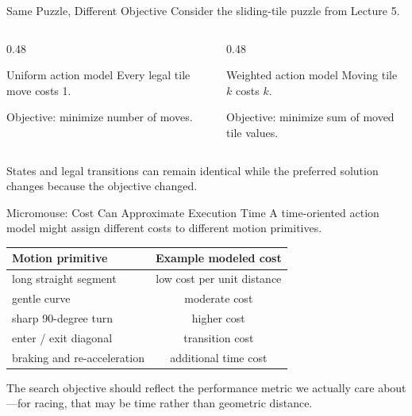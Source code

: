 \documentclass[aspectratio=169,10pt]{beamer}
\begin{document}
\begin{frame}[shrink=20]{Same Puzzle, Different Objective}
  Consider the sliding-tile puzzle from Lecture 5.

  \begin{columns}[T,onlytextwidth]
    \begin{column}{0.48\textwidth}
      \begin{block}{Uniform action model}
        Every legal tile move costs 1.

        \vspace{0.08in}
        Objective: minimize number of moves.
      \end{block}
    \end{column}

    \begin{column}{0.48\textwidth}
      \begin{block}{Weighted action model}
        Moving tile $k$ costs $k$.

        \vspace{0.08in}
        Objective: minimize sum of moved tile values.
      \end{block}
    \end{column}
  \end{columns}

  \begin{keyidea}
    States and legal transitions can remain identical while the preferred solution changes because the objective changed.
  \end{keyidea}
\end{frame}

\begin{frame}[shrink=20]{Micromouse: Cost Can Approximate Execution Time}
  A time-oriented action model might assign different costs to different motion primitives.

  \begin{center}
  \renewcommand{\arraystretch}{1.25}
  \begin{tabular}{l|c}
    \textbf{Motion primitive} & \textbf{Example modeled cost} \\\hline
    long straight segment & low cost per unit distance \\
    gentle curve & moderate cost \\
    sharp 90-degree turn & higher cost \\
    enter / exit diagonal & transition cost \\
    braking and re-acceleration & additional time cost
  \end{tabular}
  \end{center}

  \begin{keyidea}
    The search objective should reflect the performance metric we actually care about---for racing, that may be time rather than geometric distance.
  \end{keyidea}
\end{frame}
\end{document}
